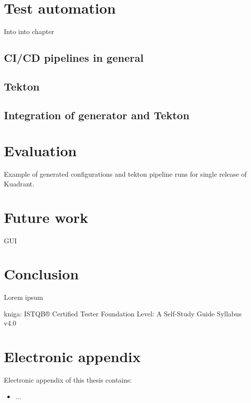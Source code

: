 \documentclass[
  digital, %
  oneside, %
  lof,     %
  nolot,     %
]{fithesis4}
\begin{document}
\chapter{Test automation}
\label{ch:test-automation}
Into into chapter
\section{CI/CD pipelines in general}

\section{Tekton}
\section{Integration of generator and Tekton}

\chapter{Evaluation}
Example of generated configurations and tekton pipeline runs for single release of Kuadrant.

\chapter{Future work}
GUI

\chapter*{Conclusion}
Lorem ipsum

kniga:
ISTQB® Certified Tester Foundation Level: A Self-Study Guide Syllabus v4.0


\appendix
\chapter{Electronic appendix}
\label{ch:e_appendix}
Electronic appendix of this thesis contains:
\begin{itemize}
    \item ...
\end{itemize}
\end{document}
